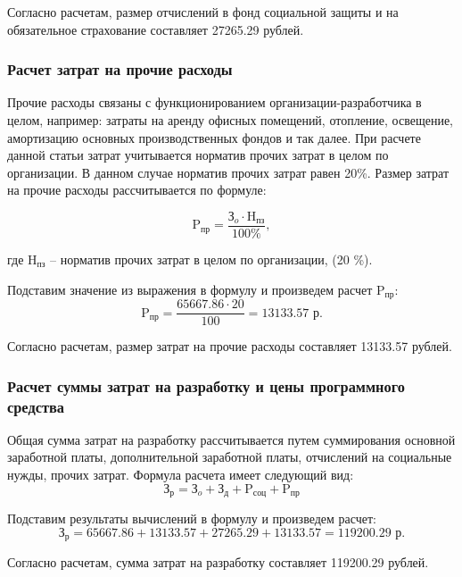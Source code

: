 Согласно расчетам, размер отчислений в фонд социальной защиты и на обязательное страхование составляет 27265.29 рублей.

\subsubsection{Расчет затрат на прочие расходы}

Прочие расходы связаны с функционированием организации-разработчика в целом, например: затраты на аренду офисных помещений, отопление, освещение, амортизацию основных производственных фондов и так далее. При расчете данной статьи затрат учитывается норматив прочих затрат в целом по организации. В данном случае норматив прочих затрат равен 20\%. Размер затрат на прочие расходы рассчитывается по формуле:

\begin{equation}
    \text{P}_{\text{пр}} = \frac{\text{З}_{o} \cdot \text{H}_{\text{пз}}}{100\%},
\end{equation}

где $\text{H}_{\text{пз}}$ -- норматив прочих затрат в целом по организации, (20 \%).

Подставим значение из выражения в формулу и произведем расчет $\text{P}_{\text{пр}}$:
$$
 \text{P}_{\text{пр}} = \frac{65667.86 \cdot 20}{100} = 13133.57 \text{ р}.
$$

Согласно расчетам, размер затрат на прочие расходы составляет 13133.57 рублей.

\subsubsection{Расчет суммы затрат на разработку и цены программного средства}

Общая сумма затрат на разработку рассчитывается путем суммирования основной заработной платы, дополнительной заработной платы, отчислений на социальные нужды, прочих затрат. Формула расчета имеет следующий вид:
\begin{equation}
    \text{З}_{\text{р}} = \text{З}_{o} + \text{З}_{\text{д}} + \text{P}_{\text{соц}} + \text{P}_{\text{пр}}
\end{equation}

Подставим результаты вычислений в формулу и произведем расчет:
$$
    \text{З}_{\text{р}} = 65667.86 + 13133.57 + 27265.29 + 13133.57 = 119200.29 \text{ р}.
$$

Согласно расчетам, сумма затрат на разработку составляет 119200.29 рублей.

